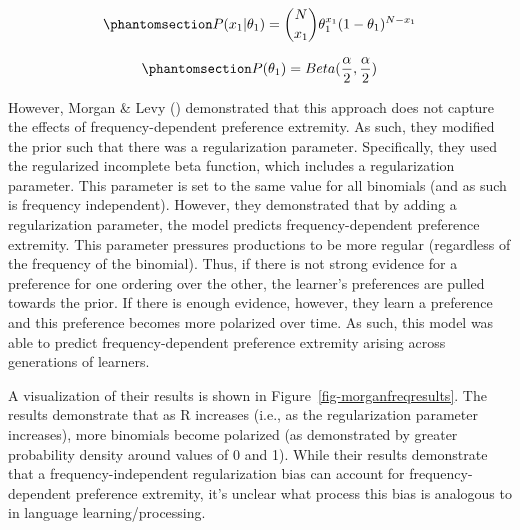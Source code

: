 \documentclass[
  12pt,
]{scrartcl}
\begin{document}
\begin{equation}\phantomsection\label{eq-likelihoodbernoulli}{
P(x_1|\theta_1)= {N \choose x_1}\theta^{x_1}_1(1-\theta_1)^{N-x_1}
}\end{equation}

\begin{equation}\phantomsection\label{eq-priorbeta}{
P(\theta_1) = Beta(\frac{\alpha}{2},\frac{\alpha}{2})
}\end{equation}

However, Morgan \& Levy
()
demonstrated that this approach does not capture the effects of
frequency-dependent preference extremity. As such, they modified the
prior such that there was a regularization parameter. Specifically, they
used the regularized incomplete beta function, which includes a
regularization parameter. This parameter is set to the same value for
all binomials (and as such is frequency independent). However, they
demonstrated that by adding a regularization parameter, the model
predicts frequency-dependent preference extremity. This parameter
pressures productions to be more regular (regardless of the frequency of
the binomial). Thus, if there is not strong evidence for a preference
for one ordering over the other, the learner's preferences are pulled
towards the prior. If there is enough evidence, however, they learn a
preference and this preference becomes more polarized over time. As
such, this model was able to predict frequency-dependent preference
extremity arising across generations of learners.

A visualization of their results is shown in
Figure~\ref{fig-morganfreqresults}. The results demonstrate that as R
increases (i.e., as the regularization parameter increases), more
binomials become polarized (as demonstrated by greater probability
density around values of 0 and 1). While their results demonstrate that
a frequency-independent regularization bias can account for
frequency-dependent preference extremity, it's unclear what process this
bias is analogous to in language learning/processing.
\end{document}
